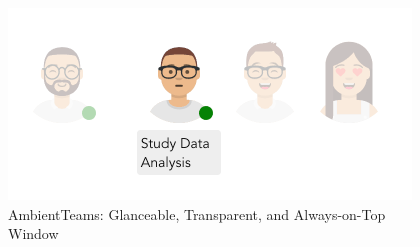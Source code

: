 \begin{figure}[h]
    \centering
    \includegraphics[width=.5\linewidth]{./images/AT_ambient_intro.png}
    \caption{AmbientTeams: Glanceable, Transparent, and Always-on-Top Window}
    \label{fig:at_ambient_intro}
\end{figure}




